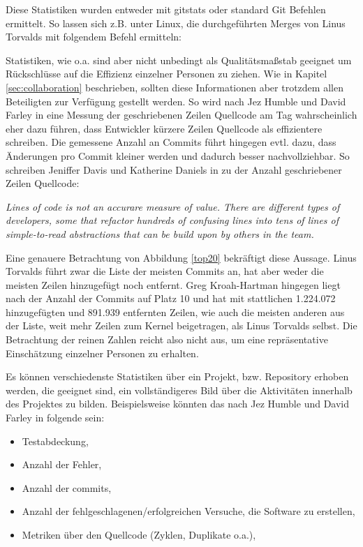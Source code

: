 Diese Statistiken wurden entweder mit gitstats\cite{link:gitstats} oder standard
Git Befehlen ermittelt. So lassen sich z.B. unter Linux, die durchgeführten
Merges von Linus Torvalds mit folgendem Befehl ermitteln:



Statistiken, wie o.a. sind aber nicht unbedingt als Qualitätsmaßstab geeignet um
Rückschlüsse auf die Effizienz einzelner Personen zu ziehen. Wie in Kapitel
\ref{sec:collaboration} beschrieben, sollten diese Informationen aber trotzdem
allen Beteiligten zur Verfügung gestellt werden.  So wird nach Jez Humble und
David Farley in \cite[S.~138]{cd} eine Messung der geschriebenen Zeilen
Quellcode am Tag wahrscheinlich eher dazu führen, dass Entwickler kürzere Zeilen
Quellcode als effizientere schreiben. Die gemessene Anzahl an Commits führt hingegen
evtl. dazu, dass Änderungen pro Commit kleiner werden und dadurch besser
nachvollziehbar. So schreiben Jeniffer Davis und Katherine Daniels in
\cite[S.~179]{effdo} zu der Anzahl geschriebener Zeilen Quellcode:
\begin{center}
\textit{\glqq{}Lines of code is not an accurare measure of value. There are
different types of developers, some that refactor hundreds of confusing lines
into tens of lines of simple-to-read abstractions that can be build upon by
others in the team.\grqq{}}
\end{center}

Eine genauere Betrachtung von Abbildung \ref{top20} bekräftigt diese Aussage.
Linus Torvalds führt zwar die Liste der meisten Commits an, hat aber weder die
meisten Zeilen hinzugefügt noch entfernt. Greg Kroah-Hartman hingegen liegt
nach der Anzahl der Commits auf Platz 10 und hat mit stattlichen 1.224.072
hinzugefügten und 891.939 entfernten Zeilen, wie auch die meisten anderen aus
der Liste, weit mehr Zeilen zum Kernel beigetragen, als Linus Torvalds selbst.
Die Betrachtung der reinen Zahlen reicht also nicht aus, um eine repräsentative
Einschätzung einzelner Personen zu erhalten.

Es können verschiedenste Statistiken über ein Projekt, bzw. Repository erhoben
werden, die geeignet sind, ein vollständigeres Bild über die Aktivitäten
innerhalb des Projektes zu bilden. Beispielsweise könnten das nach Jez Humble
und David Farley in \cite[S.~138]{cd}folgende sein:

\begin{itemize}
\item Testabdeckung,
\item Anzahl der Fehler,
\item Anzahl der \glspl{commit},
\item Anzahl der fehlgeschlagenen/erfolgreichen Versuche, die Software zu erstellen,
\item Metriken über den Quellcode (Zyklen, Duplikate o.a.),
\end{itemize}
